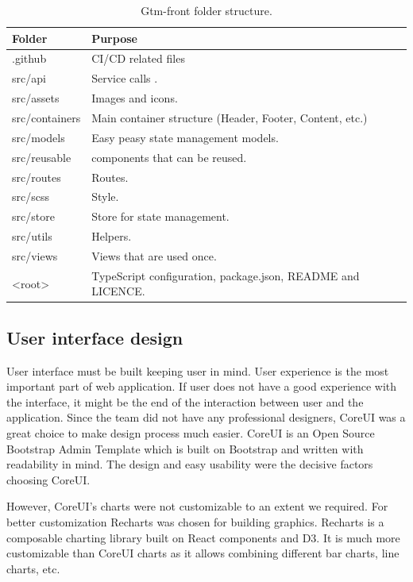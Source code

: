 \begin{table}[h]
    \centering
    \begin{tabular}{ | p{3cm} | p{10cm} |}
        \hline
        \textbf{Folder} & \textbf{Purpose}\\
        \hline
        .github & CI/CD related files\\
        \hline
        src/api & Service calls .\\
        \hline
        src/assets & Images and icons. \\
        \hline
        src/containers & Main container structure (Header, Footer, Content, etc.)\\
        \hline
        src/models & Easy peasy state management models.\\
        \hline
        src/reusable & components that can be reused.\\
        \hline
        src/routes & Routes.\\
        \hline
        src/scss & Style.\\
        \hline
        src/store & Store for state management.\\
        \hline
        src/utils & Helpers.\\
        \hline
        src/views & Views that are used once.\\
        \hline
        <root> & TypeScript configuration, package.json, README and LICENCE.\\
        \hline
    \end{tabular}
    \caption{Gtm-front folder structure.}
    \label{tab:gtm-front-folder-structure}
\end{table}

\subsection{User interface design}\label{subsec:user-interface-design}
User interface must be built keeping user in mind.
User experience is the most important part of web application.
If user does not have a good experience with the interface, it might be the end of the interaction between user and the application.
Since the team did not have any professional designers, CoreUI was a great choice to make design process much easier.
CoreUI is an Open Source Bootstrap Admin Template which is built on Bootstrap and written with readability in mind.
The design and easy usability were the decisive factors choosing CoreUI.

However, CoreUI's charts were not customizable to an extent we required.
For better customization Recharts was chosen for building graphics.
Recharts is a composable charting library built on React components and D3.
It is much more customizable than CoreUI charts as it allows combining different bar charts, line charts, etc.
\cite{recharts-readme}

